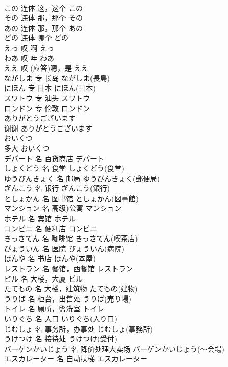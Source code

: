 \documentclass[8pt]{extreport}
\begin{document}
\begin{CJK}{UTF8}{min}
\\	この	连体	这，这个	この	
\\	その	连体	那，那个	その	
\\	あの	连体	那，那个	あの	
\\	どの	连体	哪个	どの	
\\	えっ	叹	啊	えっ	
\\	わあ	叹	哇	わあ	
\\	ええ	叹	(应答)嗯，是	ええ	
\\	ながしま	专	长岛	ながしま(長島)	
\\	にほん	专	日本	にほん(日本)	
\\	スワトウ	专	汕头	スワトウ	
\\	ロンドン	专	伦敦	ロンドン	
\\	ありがとうございます	
\\	谢谢	ありがとうございます	
\\	おいくつ	
\\	多大	おいくつ	
\\	デパート	名	百货商店	デパート	
\\	しょくどう	名	食堂	しょくどう(食堂)	
\\	ゆうびんきょく	名	邮局	ゆうびんきょく(郵便局)	
\\	ぎんこう	名	银行	ぎんこう(銀行)	
\\	としょかん	名	图书馆	としょかん(図書館)	
\\	マンション	名	高级)公寓	マンション	
\\	ホテル	名	宾馆	ホテル	
\\	コンビニ	名	便利店	コンビニ	
\\	きっさてん	名	咖啡馆	きっさてん(喫茶店)	
\\	びょういん	名	医院	びょういん(病院)	
\\	ほんや	名	书店	ほんや(本屋)	
\\	レストラン	名	餐馆，西餐馆	レストラン	
\\	ビル	名	大楼，大厦	ビル	
\\	たてもの	名	大楼，建筑物	たてもの(建物)	
\\	うりば	名	柜台，出售处	うりば(売り場)	
\\	トイレ	名	厕所，盥洗室	トイレ	
\\	いりぐち	名	入口	いりぐち(入り口)	
\\	じむしょ	名	事务所，办事处	じむしょ(事務所)	
\\	うけつけ	名	接待处	うけつけ(受付)	
\\	バーゲンかいじょう	名	降价处理大卖场	バーゲンかいじょう(～会場)	
\\	エスカレーター	名	自动扶梯	エスカレーター	

\end{CJK}
\end{document}
